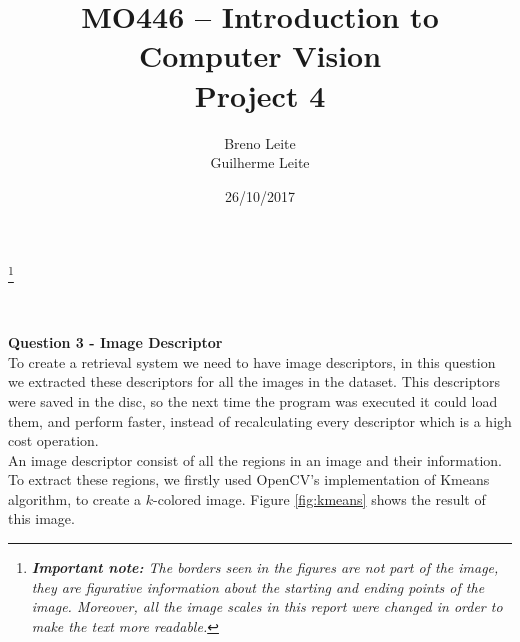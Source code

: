\documentclass[12pt,a4paper]{article}
\title{MO446 -- Introduction to Computer Vision  \\ Project 4}
\author{Breno Leite  \\ Guilherme Leite}
\date{26/10/2017}
\newcommand\blfootnote[1]{%
	\begingroup
	\renewcommand\thefootnote{}\footnote{#1}%
	\addtocounter{footnote}{-1}%
	\endgroup
}
\begin{document}
\maketitle
\blfootnote{\textit{\textbf{Important note:} The borders seen in the figures are not part of the image, they are figurative information about the starting and ending points of the image. Moreover, all the image scales in this report were changed in order to make the text more readable.}} \\


\newpage

\textbf{\LARGE Question 3 - Image Descriptor}\\

To create a retrieval system we need to have image descriptors, in this question we extracted these descriptors for all the images in the dataset. This descriptors were saved in the disc, so the next time the program was executed it could load them, and perform faster, instead of recalculating every descriptor which is a high cost operation. \\

An image descriptor consist of all the regions in an image and their information. To extract  these regions, we firstly used OpenCV's implementation of Kmeans algorithm, to create a $k$-colored image. Figure \ref{fig:kmeans} shows the result of this image. \\
\end{document}
